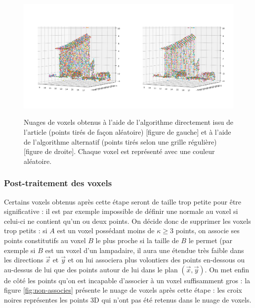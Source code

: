\documentclass[a4paper, onecolumn, 11pt]{article}
\begin{document}
\begin{figure}[h]
    \centering
    \includegraphics[width=0.5\textwidth]{fig/figgridnonregular.pdf}\includegraphics[width=0.5\textwidth]{fig/figgridregular.pdf}
    \caption{Nuages de voxels obtenus à l'aide de l'algorithme directement issu de l'article (points tirés de façon aléatoire) [figure de gauche] et à l'aide de l'algorithme alternatif (points tirés selon une grille régulière) [figure de droite]. Chaque voxel est représenté avec une couleur aléatoire.}
    \label{fig:voxelcloud}
\end{figure}

\subsubsection*{Post-traitement des voxels}
Certains voxels obtenus après cette étape seront de taille trop petite pour être significative : il est par exemple impossible de définir une normale au voxel si celui-ci ne contient qu'un ou deux points. On décide donc de supprimer les voxels trop petits : si $A$ est un voxel possédant moins de $\kappa \geq 3$ points, on associe ses points constitutifs au voxel $B$ le plus proche si la taille de $B$ le permet (par exemple si $B$ est un voxel d'un lampadaire, il aura une étendue très faible dans les directions $\overrightarrow{x}$ et $\overrightarrow{y}$ et on lui associera plus volontiers des points en-dessous ou au-dessus de lui que des points autour de lui dans le plan $(\overrightarrow{x},\overrightarrow{y})$. On met enfin de côté les points qu'on est incapable d'associer à un voxel suffisamment gros : la figure \ref{fig:non-associes} présente le nuage de voxels après cette étape : les croix noires représentes les points 3D qui n'ont pas été retenus dans le nuage de voxels.
\end{document}
